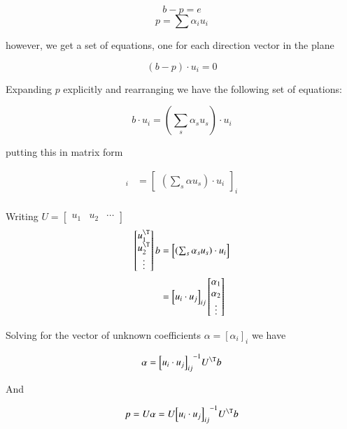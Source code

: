 \[
b - p = e
\]
\[
p = \sum \alpha_i u_i
\]

however, we get a set of equations, one for each direction vector in the plane

\[
(b - p) \cdot u_i = 0
\]

Expanding $p$ explicitly and rearranging we have the following set of equations:

\[
b \cdot u_i = (\sum_s \alpha_s u_s) \cdot u_i
\]

putting this in matrix form

\begin{align*}
[b \cdot u_i]_i 
&= 
{
\begin{bmatrix}
(\sum_s \alpha u_s) \cdot u_i
\end{bmatrix}
}_i \\
\end{align*}

Writing $U = 
\begin{bmatrix}
u_1 & u_2 & \cdots 
\end{bmatrix}$
\begin{align*}
\begin{bmatrix}
u_1^\T \\
u_2^\T \\
\vdots 
\end{bmatrix}
b
&= 
\begin{bmatrix}
(\sum_s \alpha_s u_s) \cdot u_i
\end{bmatrix} \\
&= 
{
\begin{bmatrix}
u_i \cdot u_j
\end{bmatrix}
}_{ij}
\begin{bmatrix}
\alpha_1 \\
\alpha_2 \\
\vdots \\
\end{bmatrix} \\
\end{align*}

Solving for the vector of unknown coefficients $\alpha = [\alpha_i]_i$ we have

\[
\alpha
=
{{
\begin{bmatrix}
u_i \cdot u_j
\end{bmatrix}
}_{ij}}^{-1}
U^\T b
\]

And 

\begin{equation}\label{eqn:projMatrixCompare:projectionwitheucliandot}
p = U \alpha = U
{{
\begin{bmatrix}
u_i \cdot u_j

\end{bmatrix}
}_{ij}}^{-1}
U^\T b
\end{equation}

